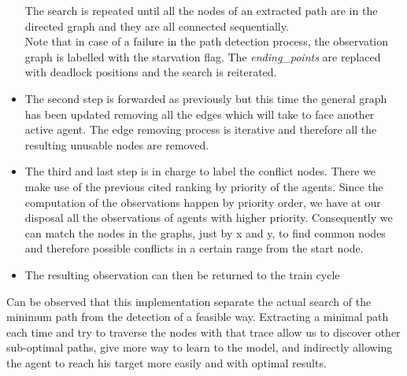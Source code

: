 \begin{itemize}
    The search is repeated until all the nodes of an extracted path are in the directed graph and they are all connected sequentially.\\ 
    Note that in case of a failure in the path detection process, the observation graph is labelled with the starvation flag. The \textit{ending\_points} are replaced with deadlock positions and the search is reiterated.\\
    \item The second step is forwarded as previously but this time the general graph has been updated removing all the edges which will take to face another active agent. The edge removing process is iterative and therefore all the resulting unusable nodes are removed.
    \item The third and last step is in charge to label the conflict nodes. There we make use of the previous cited ranking by priority of the agents. Since the computation of the observations happen by priority order, we have at our disposal all the observations of agents with higher priority. Consequently we can match the nodes in the graphs, just by x and y, to find common nodes and therefore possible conflicts in a certain range from the start node.
    \item The resulting observation can then be returned to the train cycle
\end{itemize}
\vspace{1cm} 
Can be observed that this implementation separate the actual search of the minimum path from the detection of a feasible way. Extracting a minimal path each time and try to traverse the nodes with that trace allow us to discover other sub-optimal paths, give more way to learn to the model, and indirectly allowing the agent to reach his target more easily and with optimal results.
